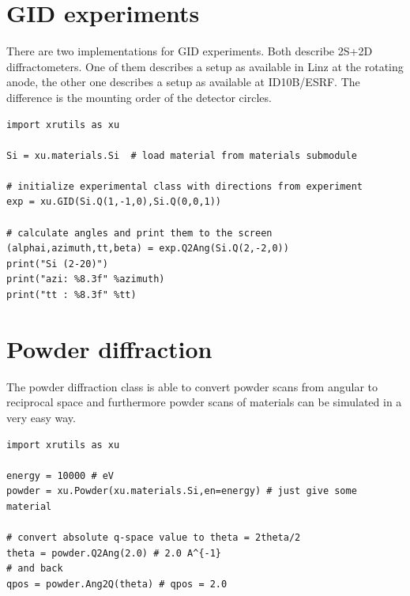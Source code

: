 \section{GID experiments}

There are two implementations for GID experiments. Both describe 2S+2D diffractometers.
One of them describes a setup as available in Linz at the rotating anode, the other one describes a setup as available at ID10B/ESRF.
The difference is the mounting order of the detector circles.

\begin{lstlisting}[caption=calculation of angles for Si Bragg reflections in GID]
import xrutils as xu

Si = xu.materials.Si  # load material from materials submodule

# initialize experimental class with directions from experiment
exp = xu.GID(Si.Q(1,-1,0),Si.Q(0,0,1))

# calculate angles and print them to the screen
(alphai,azimuth,tt,beta) = exp.Q2Ang(Si.Q(2,-2,0))
print("Si (2-20)")
print("azi: %8.3f" %azimuth)
print("tt : %8.3f" %tt)

\end{lstlisting}

\section{Powder diffraction}

The powder diffraction class is able to convert powder scans from angular to reciprocal space and furthermore powder scans of materials can be simulated in a very easy way.

\begin{lstlisting}[caption=conversion between angular and reciprocal space using the powder diffraction class]
import xrutils as xu

energy = 10000 # eV
powder = xu.Powder(xu.materials.Si,en=energy) # just give some material

# convert absolute q-space value to theta = 2theta/2
theta = powder.Q2Ang(2.0) # 2.0 A^{-1} 
# and back
qpos = powder.Ang2Q(theta) # qpos = 2.0
\end{lstlisting}

